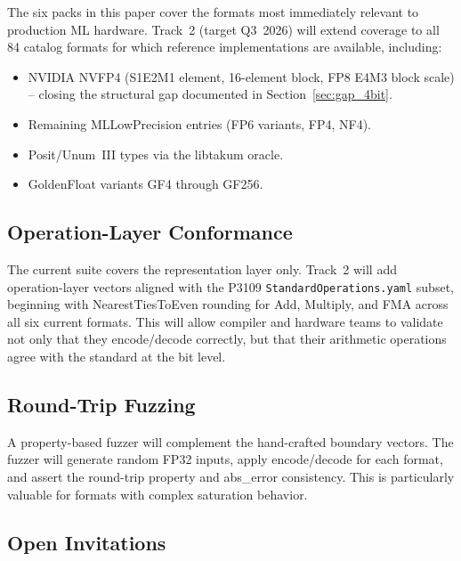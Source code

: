 \documentclass[11pt,letterpaper]{article}
\begin{document}
The six packs in this paper cover the formats most immediately relevant to
production ML hardware.  Track~2 (target Q3~2026) will extend coverage to
all 84 catalog formats for which reference implementations are available,
including:
\begin{itemize}
  \item NVIDIA NVFP4 \cite{nvfp4} (S1E2M1 element, 16-element block, FP8 E4M3
    block scale) -- closing the structural gap documented in
    Section~\ref{sec:gap_4bit}.
  \item Remaining MLLowPrecision entries (FP6 variants, FP4, NF4).
  \item Posit/Unum~III types via the libtakum \cite{libtakum} oracle.
  \item GoldenFloat variants GF4 through GF256.
\end{itemize}

\subsection{Operation-Layer Conformance}
\label{sec:track2_ops}

The current suite covers the representation layer only.  Track~2 will add
operation-layer vectors aligned with the P3109 \texttt{StandardOperations.yaml}
subset, beginning with NearestTiesToEven rounding for Add, Multiply, and FMA
across all six current formats.  This will allow compiler and hardware teams to
validate not only that they encode/decode correctly, but that their arithmetic
operations agree with the standard at the bit level.

\subsection{Round-Trip Fuzzing}

A property-based fuzzer will complement the hand-crafted boundary vectors.
The fuzzer will generate random FP32 inputs, apply encode/decode for each
format, and assert the round-trip property and abs\_error consistency.  This
is particularly valuable for formats with complex saturation behavior.

\subsection{Open Invitations}
\end{document}
